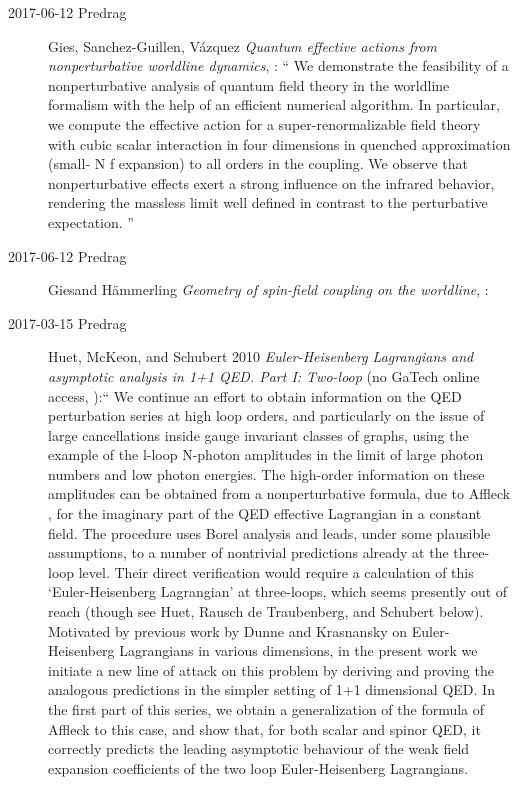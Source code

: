 \begin{description}
\item[2017-06-12 Predrag]
Gies, Sanchez-Guillen, V{\'a}zquez
{\em Quantum effective actions from nonperturbative worldline dynamics},
 : ``
We demonstrate the feasibility of a nonperturbative analysis of quantum
field theory in the worldline formalism with the help of an efficient
numerical algorithm. In particular, we compute the effective action for a
super-renormalizable field theory with cubic scalar interaction in four
dimensions in quenched approximation (small- N f expansion) to all orders
in the coupling. We observe that nonperturbative effects exert a strong
influence on the infrared behavior, rendering the massless limit well
defined in contrast to the perturbative expectation.
''

\item[2017-06-12 Predrag]
Giesand H{\"a}mmerling
{\em Geometry of spin-field coupling on the worldline},
:

\item[2017-03-15 Predrag]
Huet, McKeon, and Schubert 2010
{\em {Euler-Heisenberg} Lagrangians and asymptotic analysis in 1+1 {QED. Part I: Two}-loop}
(no GaTech online access, ):``
We continue an effort to obtain information on the QED perturbation series at
high loop orders, and particularly on the issue of large cancellations inside
gauge invariant classes of graphs, using the example of the l-loop N-photon
amplitudes in the limit of large photon numbers and low photon energies. The
high-order information on these amplitudes can be obtained from a nonperturbative
formula, due to Affleck \etal{}, for the imaginary part of the QED
effective Lagrangian in a constant field. The procedure uses Borel analysis and
leads, under some plausible assumptions, to a number of nontrivial predictions
already at the three-loop level. Their direct verification would require a
calculation of this `Euler-Heisenberg Lagrangian' at three-loops, which seems
presently out of reach (though see Huet, Rausch de Traubenberg, and
Schubert below). Motivated by previous work by Dunne and
Krasnansky on Euler-Heisenberg Lagrangians in various dimensions, in
the present work we initiate a new line of attack on this problem by deriving and
proving the analogous predictions in the simpler setting of 1+1 dimensional QED.
In the first part of this series, we obtain a generalization of the formula of
Affleck \etal{} to this case, and show that, for both scalar and
spinor QED, it correctly predicts the leading asymptotic behaviour of the weak
field expansion coefficients of the two loop Euler-Heisenberg Lagrangians.


\end{description}
